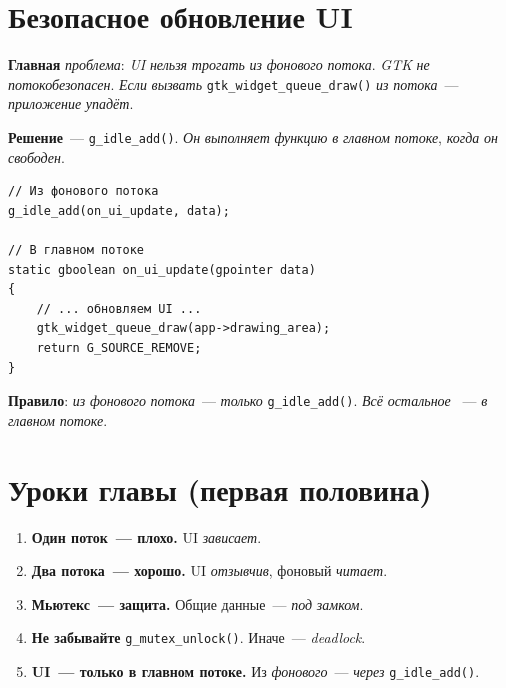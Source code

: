 \section{Безопасное обновление UI}
\label{sec:pc-idle}

\textbf{Главная} \emph{проблема}: \emph{UI} \emph{нельзя} \emph{трогать}
\emph{из} \emph{фонового} \emph{потока}. \emph{GTK} \emph{не}
\emph{потокобезопасен}. \emph{Если} \emph{вызвать}
\texttt{gtk\_widget\_queue\_draw()} \emph{из} \emph{потока}~---
\emph{приложение} \emph{упадёт}.

\textbf{Решение}~--- \texttt{g\_idle\_add()}. \emph{Он}
\emph{выполняет} \emph{функцию} \emph{в} \emph{главном} \emph{потоке},
\emph{когда} \emph{он} \emph{свободен}.

\begin{listing}[htbp]
\begin{verbatim}
// Из фонового потока
g_idle_add(on_ui_update, data);

// В главном потоке
static gboolean on_ui_update(gpointer data)
{
    // ... обновляем UI ...
    gtk_widget_queue_draw(app->drawing_area);
    return G_SOURCE_REMOVE;
}
\end{verbatim}
\caption{\texttt{g\_idle\_add()}: безопасное обновление UI}
\label{lst:pc-idle}
\end{listing}

\begin{keybox}
\textbf{Правило}: \emph{из} \emph{фонового} \emph{потока}~---
\emph{только} \texttt{g\_idle\_add()}. \emph{Всё} \emph{остальное}~
--- \emph{в} \emph{главном} \emph{потоке}.
\end{keybox}

\section{Уроки главы (первая половина)}
\label{sec:pc-lessons-so-far}

\begin{enumerate}
    \item \textbf{Один поток~--- плохо.} UI \emph{зависает}.
    \item \textbf{Два потока~--- хорошо.} UI \emph{отзывчив},
          фоновый \emph{читает}.
    \item \textbf{Мьютекс~--- защита.} Общие данные~---
          \emph{под} \emph{замком}.
    \item \textbf{Не забывайте} \texttt{g\_mutex\_unlock()}.
          Иначе~--- \emph{deadlock}.
    \item \textbf{UI~--- только в главном потоке.}
          Из \emph{фонового}~--- \emph{через} \texttt{g\_idle\_add()}.
\end{enumerate}



